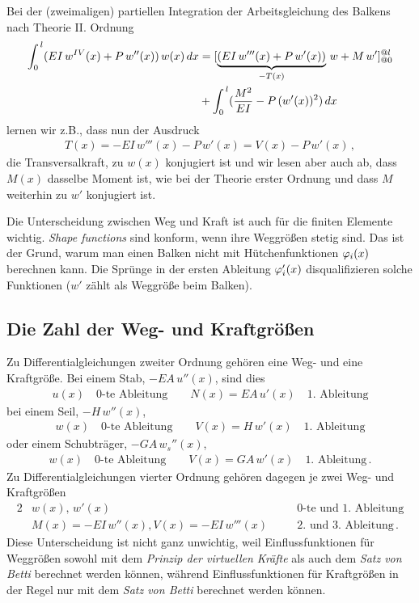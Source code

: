 {{{{{Bei der (zweimaligen) partiellen Integration der Arbeitsgleichung des Balkens nach Theorie II. Ordnung
\begin{align}
\int_0^{\,l} (EI\,w^{IV}(x) + P\,w''(x))\,w(x)\,dx &= [\underbrace{(EI\,w'''(x) + P\,w'(x))}_{- T(x)}\, w + M\,w']_{@0}^{@l}\nonumber \\ &+ \int_0^{\,l} (\frac{M^2}{EI} - P\,(w'(x))^2)\,dx
\end{align}
lernen wir z.B., dass nun der Ausdruck
\begin{align}
 T(x) = - EI\,w'''(x) - P\,w'(x) = V(x) - P\,w'(x)\,,
 \end{align}
die Transversalkraft, zu $w(x)$ konjugiert ist und wir lesen aber auch ab, dass $M(x) $ dasselbe Moment ist, wie bei der Theorie erster Ordnung und dass $M $ weiterhin zu $w' $ konjugiert ist.

Die Unterscheidung zwischen Weg und Kraft ist auch f\"{u}r die finiten Elemente wichtig. {\em Shape functions\/} sind konform, wenn ihre Weggr\"{o}{\ss}en stetig sind. Das ist der Grund, warum man einen Balken nicht mit H\"{u}tchenfunktionen $\varphi_i(x)$ berechnen kann. Die Spr\"{u}nge in der ersten Ableitung $\varphi_i'(x)$ disqualifizieren solche Funktionen ($w'$ z\"{a}hlt als Weggr\"{o}{\ss}e beim Balken). 

{\textcolor{sectionTitleBlue}{\section{Die Zahl der Weg- und Kraftgr\"{o}{\ss}en}}}
Zu Differentialgleichungen zweiter Ordnung geh\"{o}ren eine Weg- und eine Kraftgr\"{o}{\ss}e. Bei einem Stab, $-EA\,u''(x)$, sind dies
\begin{align}
u(x) \quad\text{0-te Ableitung} \qquad N(x) = EA\,u'(x)\quad\text{1. Ableitung}
\end{align}
bei einem Seil, $- H\,w''(x)$,
\begin{align}
w(x) \quad\text{0-te Ableitung} \qquad V(x) = H\,w'(x)\quad\text{1. Ableitung}
\end{align}
oder einem Schubtr\"{a}ger, $- GA\,w_s''(x)$,
\begin{align}
w(x)  \quad\text{0-te Ableitung} \qquad V(x) = GA\,w'(x)\quad\text{1. Ableitung}\,.
\end{align}
Zu Differentialgleichungen vierter Ordnung geh\"{o}ren dagegen je zwei Weg- und Kraftgr\"{o}{\ss}en
\begin{alignat}{2}
&w(x), \, w'(x) \quad&&\text{0-te und 1. Ableitung} \\
&M(x) = - EI \,w''(x), V(x) = - EI\,w'''(x) \quad&&\text{2. und 3. Ableitung}\,.
\end{alignat}
Diese Unterscheidung ist nicht ganz unwichtig, weil Einflussfunktionen f\"{u}r Weggr\"{o}{\ss}en sowohl mit dem {\em Prinzip der virtuellen Kr\"{a}fte\/} als auch dem {\em Satz von Betti\/} berechnet werden k\"{o}nnen, w\"{a}hrend Einflussfunktionen f\"{u}r Kraftgr\"{o}{\ss}en in der Regel nur mit dem {\em Satz von Betti\/} berechnet werden k\"{o}nnen.

}}}}}
